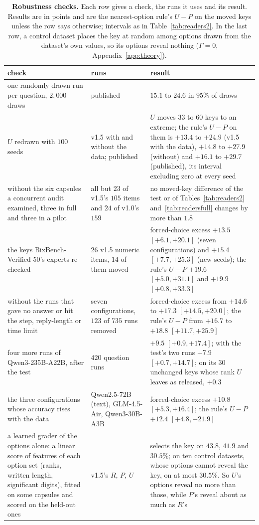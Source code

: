 \documentclass{article}
\begin{document}
\begin{table}[htbp]
\centering\footnotesize
\caption{\textbf{Robustness checks.} Each row gives a check, the runs it uses and its result. Results are in
points and are the nearest-option rule's $U-P$ on the moved keys unless the row says otherwise; intervals as in
Table~\ref{tab:readers2}. In the last row, a control dataset places the key at random among options drawn from the
dataset's own values, so its options reveal nothing ($\Gamma=0$, Appendix~\ref{app:theory}).}
\label{tab:robust}
\begin{tabularx}{\linewidth}{@{}>{\raggedright\arraybackslash}p{3.4cm}>{\raggedright\arraybackslash}p{2.6cm}>{\raggedright\arraybackslash}X@{}}
\toprule
check & runs & result\\
\midrule
one randomly drawn run per question, $2{,}000$ draws & published & $15.1$ to $24.6$ in $95\%$ of draws\\
$U$ redrawn with $100$ seeds & v1.5 with and without the data; published & $U$ moves $33$ to $60$ keys to an extreme;
the rule's $U-P$ on them is $+13.4$ to $+24.9$ (v1.5 with the data), $+14.8$ to $+27.9$ (without) and $+16.1$ to
$+29.7$ (published), its interval excluding zero at every seed\\
without the six capsules a concurrent audit examined, three in full and three in a pilot \citep{bixbenchaudit} & all but $23$ of v1.5's $105$ items and $24$ of
v1.0's $159$ & no moved-key difference of the test or of Tables~\ref{tab:readers2} and~\ref{tab:readersfull} changes by
more than $1.8$\\
the keys BixBench-Verified-50's experts re-checked \citep{verified50} & $26$ v1.5 numeric items, $14$ of them moved &
forced-choice excess $+13.5$ $[+6.1,+20.1]$ (seven configurations) and $+15.4$ $[+7.7,+25.3]$ (new seeds); the
rule's $U-P$ $+19.6$ $[+5.0,+31.1]$ and $+19.9$ $[+0.8,+33.3]$\\
without the runs that gave no answer or hit the step, reply-length or time limit & seven configurations, $123$ of $735$ runs
removed & forced-choice excess from $+14.6$ to $+17.3$ $[+14.5,+20.0]$; the rule's $U-P$ from $+16.7$ to $+18.8$
$[+11.7,+25.9]$\\
four more runs of Qwen3-235B-A22B, after the test & $420$ question runs & $+9.5$ $[+0.9,+17.4]$; with the test's two runs
$+7.9$ $[+0.7,+14.7]$; on its $30$ unchanged keys whose rank $U$ leaves as released, $+0.3$\\
the three configurations whose accuracy rises with the data & Qwen2.5-72B (text), GLM-4.5-Air, Qwen3-30B-A3B &
forced-choice excess $+10.8$ $[+5.3,+16.4]$; the rule's $U-P$ $+12.4$ $[+4.8,+21.9]$\\
a learned grader of the options alone: a linear score of features of each option set (ranks, written length,
significant digits), fitted on some capsules and scored on the held-out ones & v1.5's $R$, $P$, $U$ & selects the key on $43.8$, $41.9$
and $30.5\%$; on ten control datasets, whose options cannot reveal the key, on at most $30.5\%$. So $U$'s options
reveal no more than those, while $P$'s reveal about as much as $R$'s\\
\bottomrule
\end{tabularx}
\end{table}
\end{document}
